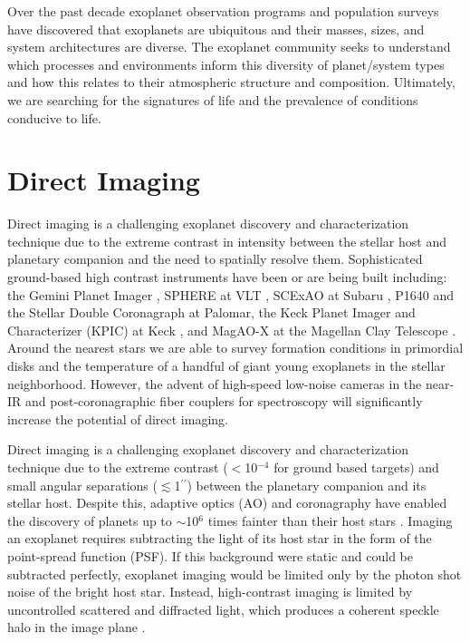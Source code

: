 \documentclass[../main.tex]{subfiles}
\begin{document}
Over the past decade exoplanet observation programs and population surveys have discovered that exoplanets are ubiquitous and their masses, sizes, and system architectures are diverse. The exoplanet community seeks to understand which processes and environments inform this diversity of planet/system types and how this relates to their atmospheric structure and composition. Ultimately, we are searching for the signatures of life and the prevalence of conditions conducive to life.

\section{Direct Imaging}

Direct imaging is a challenging exoplanet discovery and characterization technique due to the extreme contrast in intensity between the stellar host and planetary companion and the need to spatially resolve them. Sophisticated ground-based high contrast instruments have been or are being built including: the Gemini Planet Imager \parencite[GPI,][]{Macintosh2008, Macintosh2014}, SPHERE at VLT \parencite{Carbillet2011}, SCExAO at Subaru \parencite{Jovanovic2015}, P1640 \parencite{Crepp2011} and the Stellar Double Coronagraph \parencite[SDC,][]{Mawet2014} at Palomar, the Keck Planet Imager and Characterizer (KPIC) at Keck \parencite{Mawet2016}, and MagAO-X at the Magellan Clay Telescope \parencite{Males2018}. Around the nearest stars we are able to survey formation conditions in primordial disks and the temperature of a handful of giant young exoplanets in the stellar neighborhood. However, the advent of high-speed low-noise cameras in the near-IR and post-coronagraphic fiber couplers for spectroscopy will significantly increase the potential of direct imaging. 



Direct imaging is a challenging exoplanet discovery and characterization technique due to the extreme contrast ($<$10$^{-4}$ for ground based targets) and small angular separations ($\lesssim$1$^{\prime\prime}$) between the planetary companion and its stellar host. Despite this, adaptive optics (AO) and coronagraphy have enabled the discovery of planets up to $\sim$10$^6$ times fainter than their host stars \parencite{Marois+Macintosh+Barman+etal_2008, Lagrange+Bonnefoy+Chauvin+etal_2010, Kuzuhara+Tamura+Kudo+etal_2013, Macintosh+Graham+Barman+etal_2015, Keppler+Benisty+Muller+etal_2018}. Imaging an exoplanet requires subtracting the light of its host star in the form of the point-spread function (PSF). If this background were static and could be subtracted perfectly, exoplanet imaging would be limited only by the photon shot noise of the bright host star. Instead, high-contrast imaging is limited by uncontrolled scattered and diffracted light, which produces a coherent speckle halo in the image plane \parencite{Guyon_2005}.   
\end{document}

